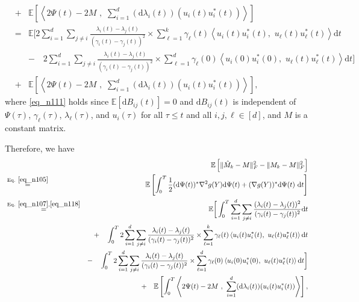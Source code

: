 \documentclass[11pt,letterpaper]{article}
\begin{document}
\begin{enumerate}
\begin{eqnarray}
%
&+&     \mathbb{E}\left[ \left \langle  2 \Psi(t) - 2M   \, \, , \, \,   \sum_{i=1}^d  (\mathrm{d}\lambda_i(t)) (u_i(t) u_i^\ast(t))     \right \rangle \right ] \nonumber\\
%
&=&\mathbb{E}\bigg[   2\sum_{i=1}^{d} \sum_{j\neq i} \frac{\lambda_i(t) - \lambda_j(t)}{(\gamma_i(t) - \gamma_j(t))^2} \times \sum_{\ell=1}^k \gamma_\ell(t)  \left \langle u_i(t) u_i^\ast(t), \, \, u_{\ell}(t) u_{\ell}^\ast(t) \right \rangle \mathrm{d}t \nonumber\\ 
 && - \quad    2\sum_{i=1}^{d} \sum_{j\neq i} \frac{\lambda_i(t) - \lambda_j(t)}{(\gamma_i(t) - \gamma_j(t))^2} \times \sum_{\ell=1}^d \gamma_\ell(0)  \left \langle u_i(0) u_i^\ast(0), \, \, u_{\ell}(t) u_{\ell}^\ast(t) \right \rangle \mathrm{d}t \bigg] \nonumber\\
 &+&     \mathbb{E}\left[ \left \langle  2 \Psi(t) - 2M   \, \, , \, \,   \sum_{i=1}^d  (\mathrm{d}\lambda_i(t)) (u_i(t) u_i^\ast(t))     \right \rangle \right ], \label{eq_n118}
\end{eqnarray}
%
where \eqref{eq_n111} holds since $\mathbb{E}[\mathrm{d}B_{ij}(t)] = 0$ and $\mathrm{d}B_{ij}(t)$ is independent of $\Psi(\tau)$, $\gamma_\ell(\tau)$, $\lambda_\ell(\tau)$, and $u_i(\tau)$ for all $\tau \leq t$ and all $i, j, \ell \in [d]$, and $M$ is a constant matrix.

\bigskip
\bigskip
\bigskip


%
Therefore, we have
 \begin{eqnarray} \label{eq_W1}
 & & \!\!\!\!\!\!\!\!\!\!\!\!\!\!\!\!\!\!\!\!\!\!\!\!\!\!\!\!\!\!\!\!\!\!\!\!\!\!\!\!\!\!\!\!\!\!\!\! \mathbb{E}\left[ \|\hat{M}_k - M\|_F^2 - \|M_k - M\|_F^2 \right]\nonumber\\
 &\stackrel{\textrm{Eq. } \eqref{eq_n105}}{=}& \mathbb{E}\left[\int_0^T  \frac{1}{2} (\mathrm{d}\Psi(t))^\ast  \nabla^2 g(Y) \mathrm{d}\Psi(t)   + (\nabla g(Y))^\ast \mathrm{d}\Psi(t) \, \, \mathrm{d}t  \right ] \nonumber\\
 &\stackrel{\textrm{Eq. } \eqref{eq_n107},  \eqref{eq_n118}}{=}& \mathbb{E}\bigg[ \int_{0}^{T}   \sum_{i=1}^{d}  \sum_{j \neq i}  \frac{(\lambda_i(t) - \lambda_j(t))^2}{(\gamma_i(t) - \gamma_j(t))^2}  \mathrm{d}t \nonumber\\
&&+ \quad  \int_{0}^{T}   2\sum_{i=1}^{d} \sum_{j\neq i} \frac{\lambda_i(t) - \lambda_j(t)}{(\gamma_i(t) - \gamma_j(t))^2} \times \sum_{\ell=1}^k \gamma_\ell(t)  \left \langle u_i(t) u_i^\ast(t), \, \, u_{\ell}(t) u_{\ell}^\ast(t) \right \rangle \mathrm{d}t \nonumber\\ 
 && - \quad    \int_{0}^{T}   2\sum_{i=1}^{d} \sum_{j\neq i} \frac{\lambda_i(t) - \lambda_j(t)}{(\gamma_i(t) - \gamma_j(t))^2} \times \sum_{\ell=1}^d \gamma_\ell(0)  \left \langle u_i(0) u_i^\ast(0), \, \, u_{\ell}(t) u_{\ell}^\ast(t) \right \rangle \mathrm{d}t \bigg] \nonumber\\
&& + \quad   \mathbb{E}\left[  \int_{0}^{T}   \left \langle  2 \Psi(t) - 2M   \, \, , \, \,   \sum_{i=1}^d  (\mathrm{d}\lambda_i(t)) (u_i(t) u_i^\ast(t))     \right \rangle \right ],
  \end{eqnarray}
% 


\end{enumerate}
\end{document}
